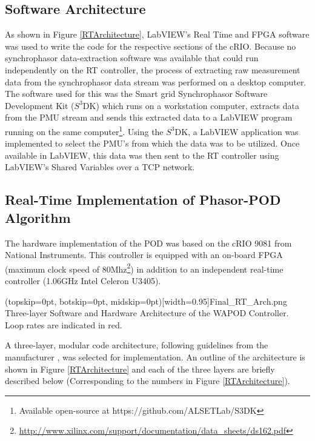 \documentclass{ieeeaccess}
\begin{document}
\subsection{Software Architecture}

As shown in Figure \ref{RTArchitecture}, LabVIEW's Real Time and FPGA software was used to write the code for the respective sections of the cRIO. Because no synchrophasor data-extraction software was available that could run independently on the RT controller, the process of extracting raw measurement data from the synchrophasor data stream was performed on a desktop computer. The software used for this was the Smart grid Synchrophasor Software Development Kit ($S^{3}$DK) which runs on a workstation computer, extracts data from the PMU stream and sends this extracted data to a LabVIEW program running on the same computer\footnote{Available open-source at https://github.com/ALSETLab/S3DK}. Using the $S^{3}$DK, a LabVIEW application was implemented to select the PMU\rq{s} from which the data was to be utilized. Once available in LabVIEW, this data was then sent to the RT controller using LabVIEW\rq{s} Shared Variables \cite{LabViewManuals} over a TCP network.

\subsection{Real-Time Implementation of Phasor-POD Algorithm}
The hardware implementation of the POD was based on the cRIO 9081 \cite{cRIO9081} from National Instruments. This controller is equipped with an on-board FPGA (maximum clock speed of 80Mhz\footnote{\underline{http://www.xilinx.com/support/documentation/data\_sheets/ds162.pdf}}) in addition to an independent real-time controller (1.06GHz Intel Celeron U3405). 

\Figure[htpb](topskip=0pt, botskip=0pt, midskip=0pt)[width=0.95\textwidth]{Final_RT_Arch.png}
{Three-layer Software and Hardware Architecture of the WAPOD Controller. Loop rates are indicated in red.\label{RTArchitecture}}

A three-layer, modular code architecture\cite{Rebello_WAPOD_Software}, following guidelines from the manufacturer \cite{LabviewTemplate}, was selected for implementation. An outline of the architecture is shown in Figure \ref{RTArchitecture} and each of the three layers are briefly described below (Corresponding to the numbers in Figure \ref{RTArchitecture}). 
\end{document}
